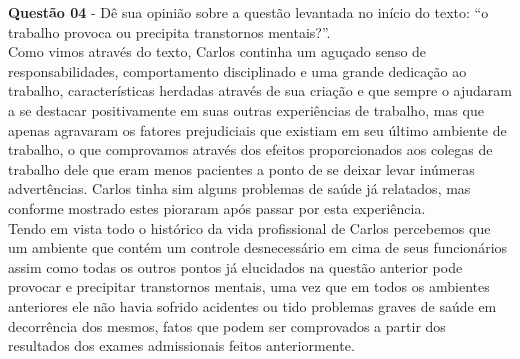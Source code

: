 \begin{description}
        \item \textbf{Questão 04} - Dê sua opinião sobre a questão levantada no início do texto: “o trabalho provoca ou precipita transtornos mentais?”. \\
        
        Como vimos através do texto, Carlos continha um aguçado senso de responsabilidades, comportamento disciplinado e uma grande dedicação ao trabalho, características herdadas através de sua criação e que sempre o ajudaram a se destacar positivamente em suas outras experiências de trabalho, mas que apenas agravaram os fatores prejudiciais que existiam em seu último ambiente de trabalho, o que comprovamos através dos efeitos proporcionados aos colegas de trabalho dele que eram menos pacientes a ponto de se deixar levar inúmeras advertências. Carlos tinha sim alguns problemas de saúde já relatados, mas conforme mostrado estes pioraram após passar por esta experiência.\\
        
        Tendo em vista todo o histórico da vida profissional de Carlos percebemos que um ambiente que contém um controle desnecessário em cima de seus funcionários assim como todas os outros pontos já elucidados na questão anterior pode provocar e precipitar transtornos mentais, uma vez que em todos os ambientes anteriores ele não havia sofrido acidentes ou tido problemas graves de saúde em decorrência dos mesmos, fatos que podem ser comprovados a partir dos resultados dos exames admissionais feitos anteriormente.
        
    \end{description}